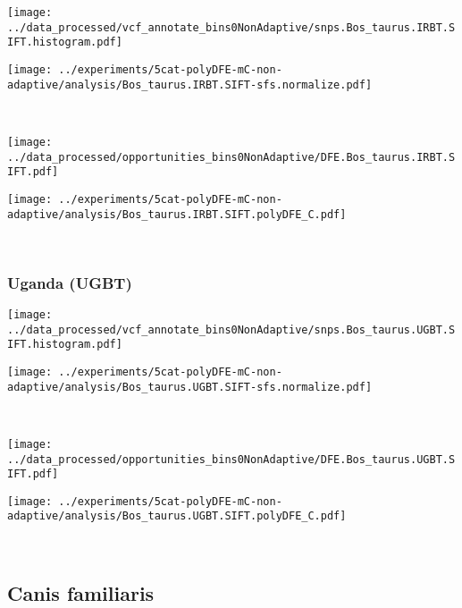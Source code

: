 \begin{minipage}{0.49\linewidth}
    \texttt{[image: ../data\_processed/vcf\_annotate\_bins0NonAdaptive/snps.Bos\_taurus.IRBT.SIFT.histogram.pdf]}
\end{minipage}
\begin{minipage}{0.49\linewidth}
    \texttt{[image: ../experiments/5cat-polyDFE-mC-non-adaptive/analysis/Bos\_taurus.IRBT.SIFT-sfs.normalize.pdf]}
\end{minipage}
\\
\begin{minipage}{0.49\linewidth}
    \texttt{[image: ../data\_processed/opportunities\_bins0NonAdaptive/DFE.Bos\_taurus.IRBT.SIFT.pdf]}
\end{minipage}
\begin{minipage}{0.49\linewidth}
    \texttt{[image: ../experiments/5cat-polyDFE-mC-non-adaptive/analysis/Bos\_taurus.IRBT.SIFT.polyDFE\_C.pdf]}
\end{minipage}
\\

\subsubsection{Uganda (UGBT)}

\begin{minipage}{0.49\linewidth}
    \texttt{[image: ../data\_processed/vcf\_annotate\_bins0NonAdaptive/snps.Bos\_taurus.UGBT.SIFT.histogram.pdf]}
\end{minipage}
\begin{minipage}{0.49\linewidth}
    \texttt{[image: ../experiments/5cat-polyDFE-mC-non-adaptive/analysis/Bos\_taurus.UGBT.SIFT-sfs.normalize.pdf]}
\end{minipage}
\\
\begin{minipage}{0.49\linewidth}
    \texttt{[image: ../data\_processed/opportunities\_bins0NonAdaptive/DFE.Bos\_taurus.UGBT.SIFT.pdf]}
\end{minipage}
\begin{minipage}{0.49\linewidth}
    \texttt{[image: ../experiments/5cat-polyDFE-mC-non-adaptive/analysis/Bos\_taurus.UGBT.SIFT.polyDFE\_C.pdf]}
\end{minipage}
\\

\subsection{Canis familiaris}

